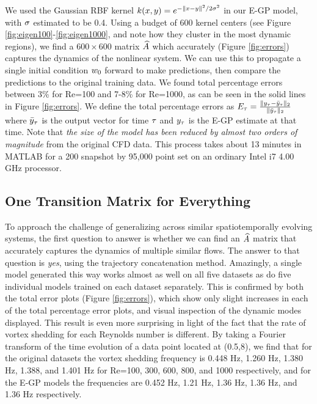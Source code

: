 We used the Gaussian RBF kernel $k(x,y) = e^{-\|x-y\|^2/2\sigma^2}$ in our E-GP model, with $\sigma$ estimated to be 0.4. Using a budget of 600 kernel centers (see Figure \ref{fig:eigen100}-\ref{fig:eigen1000}, and note how they cluster in the most dynamic regions), we find a $600\times600$ matrix $\widehat{A}$ which accurately (Figure \ref{fig:errors}) captures the dynamics of the nonlinear system. We can use this to propagate a single initial condition $w_{0}$ forward to make predictions, then compare the predictions to the original training data. We found total percentage errors between 3\% for Re=100 and 7-8\% for Re=1000, as can be seen in the solid lines in Figure \ref{fig:errors}. We define the total percentage errors as
$E_\tau = \frac{\|y_\tau-\bar y_\tau\|_2}{\|\bar y_\tau\|_2}$
where $\bar y_\tau$ is the output vector for time $\tau$ and $y_\tau$ is the E-GP estimate at that time. Note that \emph{the size of the model has been reduced by almost two orders of magnitude} from the original CFD data. This process takes about 13 minutes in MATLAB for a 200 snapshot by 95,000 point set on an ordinary Intel i7 4.00 GHz processor.

\subsection{One Transition Matrix for Everything}\label{sec:lotr}

To approach the challenge of generalizing across similar spatiotemporally evolving systems, the first question to answer is whether we can find an $\widehat{A}$ matrix that accurately captures the dynamics of multiple similar flows. The answer to that question is \textit{yes}, using the trajectory concatenation method. Amazingly, a single model generated this way works almost as well on all five datasets as do five individual models trained on each dataset separately. This is confirmed by both the total error plots (Figure \ref{fig:errors}), which show only slight increases in each of the total percentage error plots, and visual inspection of the dynamic modes displayed. This result is even more surprising in light of the fact that the rate of vortex shedding for each Reynolds number is different. By taking a Fourier transform of the time evolution of a data point located at (0.5,8), we find that for the original datasets the vortex shedding frequency is 0.448 Hz, 1.260 Hz, 1.380 Hz, 1.388, and 1.401 Hz for Re=100, 300, 600, 800, and 1000 respectively, and for the E-GP models the frequencies are 0.452 Hz, 1.21 Hz, 1.36 Hz, 1.36 Hz, and 1.36 Hz respectively.

